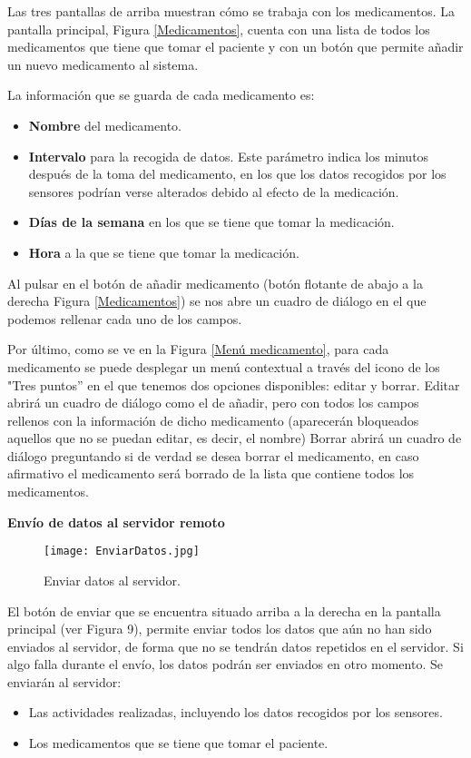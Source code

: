 \documentclass[11pt,spanish]{article}
\begin{document}
Las tres pantallas de arriba muestran cómo se trabaja con los medicamentos. La pantalla principal, Figura \ref{Medicamentos}, cuenta con una lista de todos los medicamentos que tiene que tomar el paciente y con un botón que permite añadir un nuevo medicamento al sistema.
\newline

La información que se guarda de cada medicamento es:

\begin{itemize}
	\item {\bf Nombre} del medicamento.
	\item {\bf Intervalo} para la recogida de datos. Este parámetro indica los minutos después de la toma del medicamento, en los que los datos recogidos por los sensores podrían verse alterados debido al efecto de la medicación.
	\item {\bf Días de la semana} en los que se tiene que tomar la medicación.
	\item {\bf Hora} a la que se tiene que tomar la medicación.
\end{itemize}

Al pulsar en el botón de añadir medicamento (botón flotante de abajo a la derecha Figura \ref{Medicamentos}) se nos abre un cuadro de diálogo en el que podemos rellenar cada uno de los campos.
\newline

Por último, como se ve en la Figura \ref{Menú medicamento}, para cada medicamento se puede desplegar un menú contextual a través del icono de los "Tres puntos'' en el que tenemos dos opciones disponibles: editar y borrar. Editar abrirá un cuadro de diálogo como el de añadir, pero con todos los campos rellenos con la información de dicho medicamento (aparecerán bloqueados aquellos que no se puedan editar, es decir, el nombre) Borrar abrirá un cuadro de diálogo preguntando si de verdad se desea borrar el medicamento, en caso afirmativo el medicamento será borrado de la lista que contiene todos los medicamentos.
\newline

{\bf Envío de datos al servidor remoto}
\newline
\begin{figure}[!htb]
\centering
\texttt{[image: EnviarDatos.jpg]}
\caption{Enviar datos al servidor.}
\end{figure}

El botón de enviar que se encuentra situado arriba a la derecha en la pantalla principal (ver Figura 9), permite enviar todos los datos que aún no han sido enviados al servidor, de forma que no se tendrán datos repetidos en el servidor. Si algo falla durante el envío, los datos podrán ser enviados en otro momento. Se enviarán al servidor:
\begin{itemize}
	\item Las actividades realizadas, incluyendo los datos recogidos por los sensores.
	\item Los medicamentos que se tiene que tomar el paciente.
\end{itemize}
\end{document}
